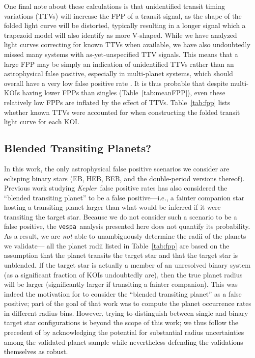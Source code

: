 \documentclass{emulateapj}
\newcommand{\Tab}[1]{Table~\ref{tab:#1}}
\newcommand{\tab}[1]{\Tab{#1}}
\newcommand{\sectlabel}[1]{\label{sect:#1}}
\newcommand{\kepler}{\textit{Kepler}}
\newcommand{\vespa}{\texttt{vespa}}
\begin{document}
One final note about these calculations is that unidentified transit
timing variations (TTVs) will increase the FPP of a transit signal, as
the shape of the folded light curve will be distorted, typically
resulting in a longer signal which a trapezoid model will also
identify as more V-shaped.  While we have analyzed light curves
correcting for known TTVs when available, we have also undoubtedly
missed many systems with as-yet-unspecified TTV signals.  This means
that a large FPP may be simply an indication of unidentified TTVs
rather than an astrophysical false positive, especially in  
multi-planet systems, which should overall have a very low false positive
rate \citep{Lissauer:2014,Rowe:2014}.  It is thus probable that
despite multi-KOIs having lower FPPs than singles (\tab{meanFPP}),
even these relatively low FPPs are inflated by the effect of TTVs.
\Tab{fpp} lists whether known TTVs were accounted for when constructing
the folded transit light curve for each KOI.




\subsection{Blended Transiting Planets?}
\sectlabel{btp}

In this work, the only astrophysical false positive scenarios we consider are 
eclisping binary stars (EB, HEB, BEB, and the double-period versions
thereof).  Previous work studying \kepler\ false positive rates
\citep[e.g.][]{Fressin:2013} has also considered the  ``blended transiting
planet'' to be a false positive---i.e.,  a fainter companion
star hosting a transiting planet larger than what would be inferred if
it were transiting the target star.  Because we do not consider such
a scenario to be a false positive, the \vespa\ analysis presented here 
does not quantify its probability.  As a result, we are \textit{not}
able to unambiguously determine the radii of the planets we validate---
all the planet radii listed in \tab{fpp} are based on the assumption
that the planet transits the target star and that the target star is 
unblended.  If the target star is actually a member of an unresolved
binary system (as a significant fraction of KOIs undoubtedly are),
then the true planet radius will be larger (significantly larger 
if transiting a fainter companion).  This was indeed the motivation
for \citet{Fressin:2013} to consider the ``blended transiting planet''
as a false positive; part of the goal of that work was to 
compute the planet occurrence rates in different radius bins.  
However, trying to distinguish between single and binary target
star configurations is beyond the scope of this work; we thus follow
the precedent of \citet[][especially Section 5]{Lissauer:2014} by 
acknowledging the potential for substantial radius
uncertainties among the validated planet sample while nevertheless 
defending the validations themselves as robust.   
\end{document}

